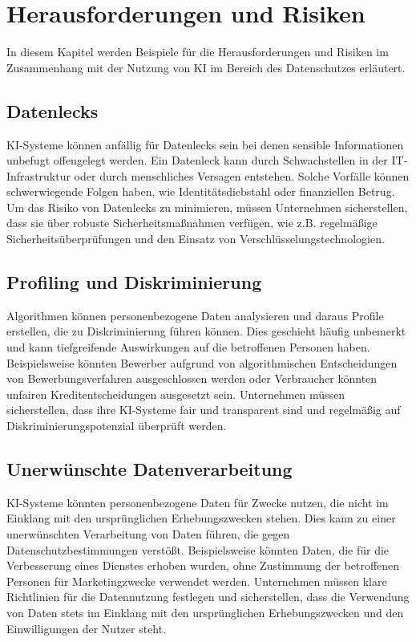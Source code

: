 \chapter{Herausforderungen und Risiken}

In diesem Kapitel werden Beispiele für die Herausforderungen und Risiken im Zusammenhang mit
der Nutzung von KI im Bereich des Datenschutzes erläutert. 


\section{Datenlecks}

KI-Systeme können anfällig für Datenlecks sein bei denen sensible Informationen
unbefugt offengelegt werden. Ein Datenleck kann durch Schwachstellen in der
IT-Infrastruktur oder durch menschliches Versagen entstehen. Solche Vorfälle
können schwerwiegende Folgen haben, wie Identitätsdiebstahl oder finanziellen
Betrug. Um das Risiko von Datenlecks zu minimieren, müssen Unternehmen
sicherstellen, dass sie über robuste Sicherheitsmaßnahmen verfügen, wie z.B.
regelmäßige Sicherheitsüberprüfungen und den Einsatz von
Verschlüsselungstechnologien.

\section{Profiling und Diskriminierung}

Algorithmen können personenbezogene Daten analysieren und daraus Profile
erstellen, die zu Diskriminierung führen können. Dies geschieht häufig unbemerkt
und kann tiefgreifende Auswirkungen auf die betroffenen Personen haben.
Beispielsweise könnten Bewerber aufgrund von algorithmischen Entscheidungen von
Bewerbungsverfahren ausgeschlossen werden oder Verbraucher könnten unfairen
Kreditentscheidungen ausgesetzt sein. Unternehmen müssen sicherstellen, dass
ihre KI-Systeme fair und transparent sind und regelmäßig auf
Diskriminierungspotenzial überprüft werden.

\section{Unerwünschte Datenverarbeitung}

KI-Systeme könnten personenbezogene Daten für Zwecke nutzen, die nicht im
Einklang mit den ursprünglichen Erhebungszwecken stehen. Dies kann zu einer
unerwünschten Verarbeitung von Daten führen, die gegen Datenschutzbestimmungen
verstößt. Beispielsweise könnten Daten, die für die Verbesserung eines Dienstes
erhoben wurden, ohne Zustimmung der betroffenen Personen für Marketingzwecke
verwendet werden. Unternehmen müssen klare Richtlinien für die Datennutzung
festlegen und sicherstellen, dass die Verwendung von Daten stets im Einklang mit
den ursprünglichen Erhebungszwecken und den Einwilligungen der Nutzer steht.
